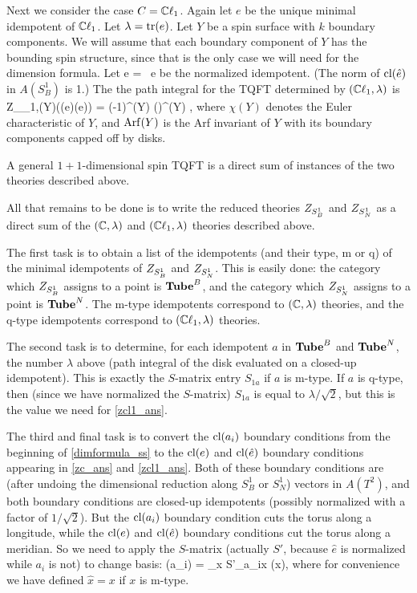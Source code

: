 Next we consider the case $C = \mathbb{C}\ell_1$.
Again let $e$ be the unique minimal idempotent of $\mathbb{C}\ell_1$.
Let $\lambda = \text{tr}(e)$.
Let $Y$ be a spin surface with $k$ boundary components.
We will assume that each boundary component of $Y$ has the bounding spin structure, since that is the only case
we will need for the dimension formula.
Let
\be
	\hat e =  \, e
\ee
be the normalized idempotent.
(The norm of $\text{cl}(\hat e)$ in $A(S^1_B)$ is 1.)
The the path integral for the TQFT determined by $(\mathbb{C}\ell_1, \lambda)$ is
\be \label{zcl1_ans}
	Z_{\cliff_1,\lambda}(Y)(\cl(\hat e)\du\cdots\du \cl(\hat e)) = (-1)^{\Arf(Y)} \left(\right)^{\chi(Y)} ,
\ee
where $\chi(Y)$ denotes the Euler characteristic of $Y$,
and $\operatorname{Arf}(Y)$ is the Arf invariant of $Y$ with its boundary components capped off by disks.

A general $1{+}1$-dimensional spin TQFT is a direct sum of instances of the two theories described above.

\medskip

All that remains to be done is to write the reduced theories $Z_{S^1_B}$ and $Z_{S^1_N}$ as a direct sum of the $(\mathbb{C}, \lambda)$ and
$(\mathbb{C}\ell_1, \lambda)$ theories described above.

The first task is to obtain a list of the idempotents (and their type, m or q) of the minimal
idempotents of $Z_{S^1_B}$ and $Z_{S^1_N}$.
This is easily done: the category which $Z_{S^1_B}$ assigns to a point is $\textbf{Tube}^B$, and the 
category which $Z_{S^1_N}$ assigns to a point is $\textbf{Tube}^N$.
The m-type idempotents correspond to $(\mathbb{C},\lambda)$ theories, and the q-type idempotents
correspond to $(\mathbb{C}\ell_1,\lambda)$ theories.

The second task is to determine, for each idempotent $a$ in $\textbf{Tube}^B$ and $\textbf{Tube}^N$,
the number $\lambda$ above (path integral of the disk evaluated on a closed-up idempotent).
This is exactly the $S$-matrix entry $S_{1a}$ if $a$ is m-type.
If $a$ is q-type, then (since we have normalized the $S$-matrix) $S_{1a}$ is equal to $\lambda/\sqrt 2$, but this
is the value we need for \eqref{zcl1_ans}.

The third and final task is to convert the $\text{cl}(a_i)$ boundary conditions from the beginning of \ref{dimformula_ss}
to the $\text{cl}(e)$ and $\text{cl}(\hat e)$ boundary conditions appearing in \eqref{zc_ans} and \eqref{zcl1_ans}.
Both of these boundary conditions are (after undoing the dimensional reduction along $S^1_B$ or $S^1_N$) vectors
in $A(T^2)$, and both boundary conditions are closed-up idempotents (possibly normalized with a factor of $1/\sqrt 2$).
But the $\text{cl}(a_i)$ boundary condition cuts the torus along a longitude, while the $\text{cl}(e)$ and $\text{cl}(\hat e)$ boundary conditions
cut the torus along a meridian.
So we need to apply the $S$-matrix (actually $S'$, because $\hat e$ is normalized while $a_i$ is not) to change basis:
\be  \label{df_cob}
	\cl(a_i) = \sum_x S'_{a_ix} \cl(\hat x),
\ee
where for convenience we have defined $\hat x = x$ if $x$ is m-type.

